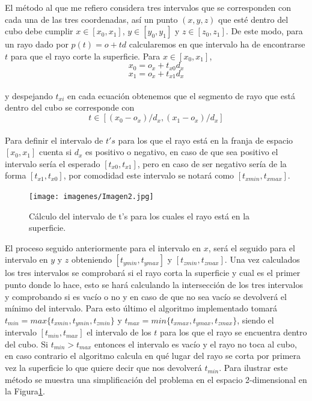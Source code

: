 El método al que me refiero considera tres intervalos que se corresponden con cada una de las tres coordenadas, así un punto $(x, y, z)$ que esté dentro del cubo debe cumplir $x \in [x_0, x_1]$, $y \in [y_0, y_1]$ y $z \in [z_0, z_1]$. De este modo, para un rayo dado por $p(t) = o + td$ calcularemos en que intervalo ha de encontrarse $t$ para que el rayo corte la superficie. Para $x \in [x_0, x_1]$,
${ }$\\
\[
	x_0 = o_x + t_{x0}d_x
\]
\[
	x_1 = o_x + t_{x1}d_x
\]
${ }$\\
y despejando $t_{xi}$ en cada ecuación obtenemos que el segmento de rayo que está dentro del cubo se corresponde con
${ }$\\
\[
	t \in [(x_0-o_x)/d_x, (x_1-o_x)/d_x]
\]
${ }$\\

Para definir el intervalo de $t's$ para los que el rayo está en la franja de espacio $[x_0, x_1]$ cuenta si $d_x$ es positivo o negativo, en caso de que sea positivo el intervalo sería el esperado $[t_{x0}, t_{x1}]$, pero en caso de ser negativo sería de la forma $[t_{x1}, t_{x0}]$, por comodidad este intervalo se notará como $[t_{x min}, t_{x max}]$.
	${ }$\\	
\begin{figure}[h]
	\begin{center}
		\texttt{[image: imagenes/Imagen2.jpg]}
	\end{center}
	\caption{Cálculo del intervalo de t's para los cuales el rayo está en la superficie.}
	\label{fig:etiq_4}
\end{figure}




El proceso seguido anteriormente para el intervalo en $x$, será el seguido para el intervalo en $y$ y $z$ obteniendo $[t_{y min}, t_{y max}]$ y $[t_{z min}, t_{z max}]$. Una vez calculados los tres intervalos se comprobará si el rayo corta la superficie y cual es el primer punto donde lo hace, esto se hará calculando la intersección de los tres intervalos y comprobando si es vacío o no y en caso de que no sea vacío se devolverá el mínimo del intervalo. Para esto último el algoritmo implementado tomará $t_{min} = max\{t_{x min}, t_{y min}, t_{z min}\}$ y $t_{max} = min\{t_{x max}, t_{y max}, t_{z max}\}$, siendo el intervalo $[t_{min}, t_{max}]$ el intervalo de los $t$ para los que el rayo se encuentra dentro del cubo. Si $t_{min} > t_{max}$ entonces el intervalo es vacío y el rayo no toca al cubo, en caso contrario el algoritmo calcula en qué lugar del rayo se corta por primera vez la superficie lo que quiere decir que nos devolverá $t_{min}$. Para ilustrar este método se muestra una simplificación del problema en el espacio 2-dimensional en la Figura\ref{fig:etiq_4}.
	${ }$\\	



